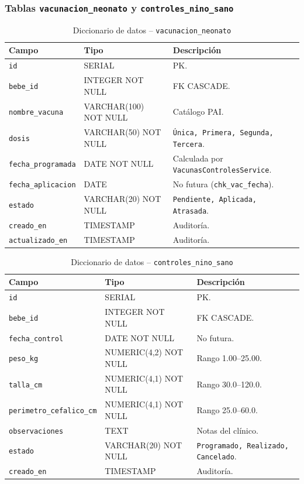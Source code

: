 \documentclass[12pt,letterpaper]{article}
\begin{document}
\subsubsection{Tablas \texttt{vacunacion\_neonato} y \texttt{controles\_nino\_sano}}

\begin{longtable}{p{}p{}p{}}
\caption{Diccionario de datos -- \texttt{vacunacion\_neonato}}\\\toprule
\textbf{Campo} & \textbf{Tipo} & \textbf{Descripción} \\\midrule
\endhead
\texttt{id} & SERIAL & PK.\\\hline
\texttt{bebe\_id} & INTEGER NOT NULL & FK CASCADE.\\\hline
\texttt{nombre\_vacuna} & VARCHAR(100) NOT NULL & Catálogo PAI.\\\hline
\texttt{dosis} & VARCHAR(50) NOT NULL & \texttt{Única, Primera, Segunda, Tercera}.\\\hline
\texttt{fecha\_programada} & DATE NOT NULL & Calculada por \texttt{VacunasControlesService}.\\\hline
\texttt{fecha\_aplicacion} & DATE & No futura (\texttt{chk\_vac\_fecha}).\\\hline
\texttt{estado} & VARCHAR(20) NOT NULL & \texttt{Pendiente, Aplicada, Atrasada}.\\\hline
\texttt{creado\_en} & TIMESTAMP & Auditoría.\\\hline
\texttt{actualizado\_en} & TIMESTAMP & Auditoría.\\\bottomrule
\end{longtable}

\begin{longtable}{p{}p{}p{}}
\caption{Diccionario de datos -- \texttt{controles\_nino\_sano}}\\\toprule
\textbf{Campo} & \textbf{Tipo} & \textbf{Descripción} \\\midrule
\endhead
\texttt{id} & SERIAL & PK.\\\hline
\texttt{bebe\_id} & INTEGER NOT NULL & FK CASCADE.\\\hline
\texttt{fecha\_control} & DATE NOT NULL & No futura.\\\hline
\texttt{peso\_kg} & NUMERIC(4,2) NOT NULL & Rango 1.00--25.00.\\\hline
\texttt{talla\_cm} & NUMERIC(4,1) NOT NULL & Rango 30.0--120.0.\\\hline
\texttt{perimetro\_cefalico\_cm} & NUMERIC(4,1) NOT NULL & Rango 25.0--60.0.\\\hline
\texttt{observaciones} & TEXT & Notas del clínico.\\\hline
\texttt{estado} & VARCHAR(20) NOT NULL & \texttt{Programado, Realizado, Cancelado}.\\\hline
\texttt{creado\_en} & TIMESTAMP & Auditoría.\\\bottomrule
\end{longtable}
\end{document}

